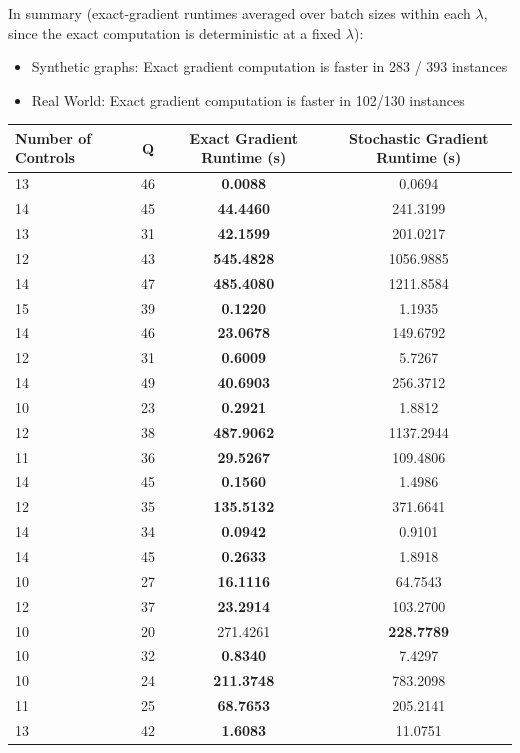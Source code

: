 \documentclass{article}
\begin{document}
In summary (exact-gradient runtimes averaged over batch sizes within each $\lambda$, since the exact computation is deterministic at a fixed $\lambda$):
\begin{itemize}
    \item Synthetic graphs: Exact gradient computation is faster in 283 / 393 instances
    \item Real World: Exact gradient computation is faster in 102/130 instances
\end{itemize}

\begin{table}[h]
\centering
\begin{tabular}{lccc}
\toprule
Number of Controls & Q & Exact Gradient Runtime (s) & Stochastic Gradient Runtime (s) \\
\midrule
13 & 46 & \textbf{0.0088} & 0.0694 \\
14 & 45 & \textbf{44.4460} & 241.3199 \\
13 & 31 & \textbf{42.1599} & 201.0217 \\
12 & 43 & \textbf{545.4828} & 1056.9885 \\
14 & 47 & \textbf{485.4080} & 1211.8584 \\
15 & 39 & \textbf{0.1220} & 1.1935 \\
14 & 46 & \textbf{23.0678} & 149.6792 \\
12 & 31 & \textbf{0.6009} & 5.7267 \\
14 & 49 & \textbf{40.6903} & 256.3712 \\
10 & 23 & \textbf{0.2921} & 1.8812 \\
12 & 38 & \textbf{487.9062} & 1137.2944 \\
11 & 36 & \textbf{29.5267} & 109.4806 \\
14 & 45 & \textbf{0.1560} & 1.4986 \\
12 & 35 & \textbf{135.5132} & 371.6641 \\
14 & 34 & \textbf{0.0942} & 0.9101 \\
14 & 45 & \textbf{0.2633} & 1.8918 \\
10 & 27 & \textbf{16.1116} & 64.7543 \\
12 & 37 & \textbf{23.2914} & 103.2700 \\
10 & 20 & 271.4261 & \textbf{228.7789} \\
10 & 32 & \textbf{0.8340} & 7.4297 \\
10 & 24 & \textbf{211.3748} & 783.2098 \\
11 & 25 & \textbf{68.7653} & 205.2141 \\
13 & 42 & \textbf{1.6083} & 11.0751 \\

\end{tabular}
\end{table}
\end{document}
